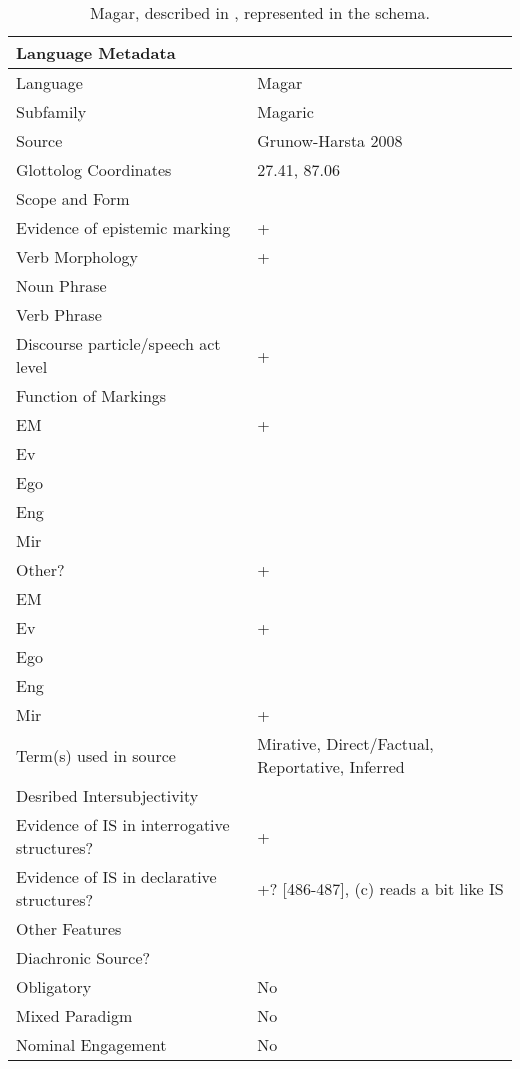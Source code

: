 \begin{table}
  \begin{tabular}{|l|l|}
  \hline\hline
  \multicolumn{2}{|l|}{Language Metadata} \\ \hline
  Language & Magar \\ \hline
  Subfamily & Magaric \\ \hline
  Source & Grunow-Harsta 2008 \\ \hline
  Glottolog Coordinates & 27.41, 87.06 \\ \hline \hline
  \multicolumn{2}{|l|}{Scope and Form} \\ \hline
  Evidence of epistemic marking & + \\ \hline
  Verb Morphology & + \\ \hline
  Noun Phrase &  \\ \hline
  Verb Phrase &  \\ \hline
  Discourse particle/speech act level & + \\ \hline \hline
  \multicolumn{2}{|l|}{Function of Markings} \\ \hline
  EM & + \\ \hline
  Ev &  \\ \hline
  Ego &  \\ \hline
  Eng &  \\ \hline
  Mir &  \\ \hline
  Other? & + \\ \hline \hline
  EM &  \\ \hline
  Ev & + \\ \hline
  Ego &  \\ \hline
  Eng &  \\ \hline
  Mir & + \\ \hline \hline
  Term(s) used in source & Mirative, Direct/Factual, Reportative, Inferred \\ \hline \hline
  \multicolumn{2}{|l|}{Desribed Intersubjectivity} \\ \hline
  Evidence of IS in interrogative structures? & + \\ \hline
  Evidence of IS in declarative structures? & +? {[}486-487{]}, (c) reads a bit like IS \\ \hline \hline
  \multicolumn{2}{|l|}{Other Features} \\ \hline
  Diachronic Source? &  \\ \hline
  Obligatory & No \\ \hline 
  Mixed Paradigm & No \\ \hline
  Nominal Engagement & No \\ \hline \hline
  \end{tabular}
  \caption{Magar, described in , represented in the schema.}\label{t:Methods:SchemaExample}
  \end{table}

